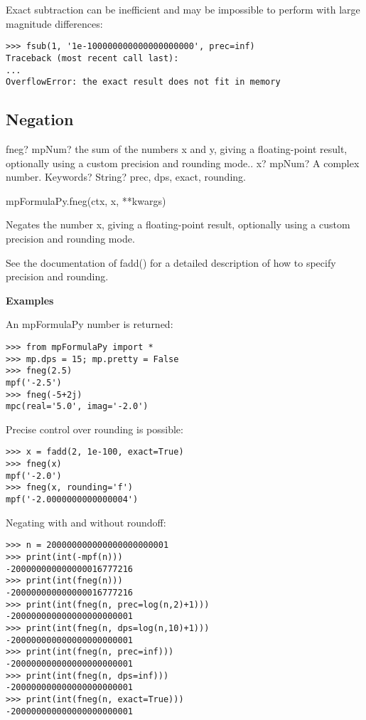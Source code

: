 Exact subtraction can be inefficient and may be impossible to perform with large magnitude differences:

\begin{lstlisting}
>>> fsub(1, '1e-100000000000000000000', prec=inf)
Traceback (most recent call last):
...
OverflowError: the exact result does not fit in memory
\end{lstlisting}


\subsection{Negation}

\begin{mpFunctionsExtract}
	\mpFunctionTwo
	{fneg? mpNum? the sum of the numbers x and y, giving a floating-point result, optionally using a custom precision and rounding mode..}
	{x? mpNum? A complex number.}
	{Keywords? String? prec, dps, exact, rounding.}	
\end{mpFunctionsExtract}

\vspace{0.3cm}

mpFormulaPy.fneg(ctx, x, **kwargs)

\vpara
Negates the number x, giving a floating-point result, optionally using a custom precision and rounding mode.

\vpara
See the documentation of fadd() for a detailed description of how to specify precision and rounding.

\vpara
\textbf{Examples}

An mpFormulaPy number is returned:

\begin{lstlisting}
>>> from mpFormulaPy import *
>>> mp.dps = 15; mp.pretty = False
>>> fneg(2.5)
mpf('-2.5')
>>> fneg(-5+2j)
mpc(real='5.0', imag='-2.0')
\end{lstlisting}


Precise control over rounding is possible:

\begin{lstlisting}
>>> x = fadd(2, 1e-100, exact=True)
>>> fneg(x)
mpf('-2.0')
>>> fneg(x, rounding='f')
mpf('-2.0000000000000004')
\end{lstlisting}


Negating with and without roundoff:

\begin{lstlisting}
>>> n = 200000000000000000000001
>>> print(int(-mpf(n)))
-200000000000000016777216
>>> print(int(fneg(n)))
-200000000000000016777216
>>> print(int(fneg(n, prec=log(n,2)+1)))
-200000000000000000000001
>>> print(int(fneg(n, dps=log(n,10)+1)))
-200000000000000000000001
>>> print(int(fneg(n, prec=inf)))
-200000000000000000000001
>>> print(int(fneg(n, dps=inf)))
-200000000000000000000001
>>> print(int(fneg(n, exact=True)))
-200000000000000000000001
\end{lstlisting}





